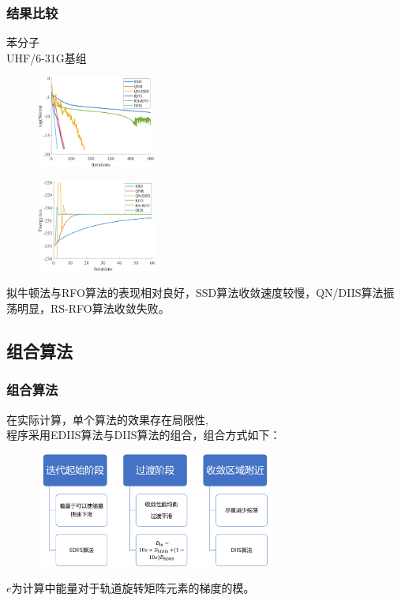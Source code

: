 \documentclass[10pt,aspectratio=43,mathserif,UTF8]{beamer}
\begin{document}
\begin{frame}
	\frametitle{结果比较}
	苯分子\\
	UHF/6-31G基组

	
	\begin{figure}[ht!]
		\centering
		\begin{minipage}{0.4\linewidth}
			\centering
			\includegraphics[height=3cm]{figure/benzene/NORM4.png}
			\label{fig:benzene:lognorm}
		\end{minipage}
		\begin{minipage}{0.4\linewidth}
			\centering
			\includegraphics[height=3cm]{figure/benzene/E6.png}
			\label{fig:benzene:E1}
		\end{minipage}
	\end{figure}
	拟牛顿法与RFO算法的表现相对良好，SSD算法收敛速度较慢，QN/DIIS算法振荡明显，RS-RFO算法收敛失败。
\end{frame}
\subsection{组合算法}
\begin{frame}
	\frametitle{组合算法}
	在实际计算，单个算法的效果存在局限性,\\
	程序采用EDIIS算法与DIIS算法的组合，组合方式如下：
	
	\begin{figure}[htbp]
		\centering
		\includegraphics[width=0.7\textwidth]{figure/HF/idea2.png}
	\end{figure}
	
	$e$为计算中能量对于轨道旋转矩阵元素的梯度的模。

	
\end{frame}
\end{document}
